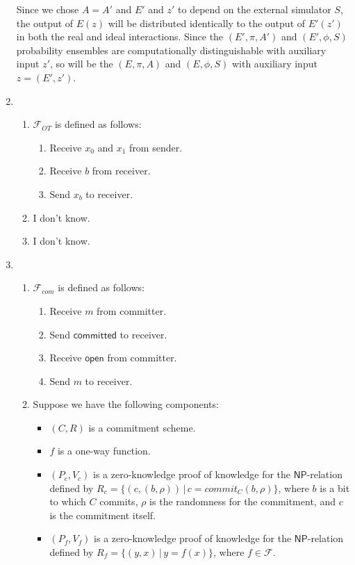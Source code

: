 \documentclass[draft]{article}
\newcommand{\class}[1]{{\ensuremath{\mathsf{#1}}}}
\newcommand{\NP}{\class{NP}}
\begin{document}
\begin{enumerate}
  Since we chose $A=A'$ and $E'$ and $z'$ to depend on the external simulator $S$, the output of $E(z)$ will be distributed identically to the output of $E'(z')$ in both the real and ideal interactions.
  Since the $(E', \pi, A')$ and $(E', \phi, S)$ probability ensembles are computationally distinguishable with auxiliary input $z'$, so will be the $(E, \pi, A)$ and $(E, \phi, S)$ with auxiliary input $z=(E', z')$.
\item
  \begin{enumerate}
  \item $\mathcal{F}_{OT}$ is defined as follows:
    \begin{enumerate}
    \item Receive $x_0$ and $x_1$ from sender.
    \item Receive $b$ from receiver.
    \item Send $x_b$ to receiver.
    \end{enumerate}
  \item I don't know.
  \item I don't know.
  \end{enumerate}
\item
  \begin{enumerate}
  \item $\mathcal{F}_{com}$ is defined as follows:
    \begin{enumerate}
    \item Receive $m$ from committer.
    \item Send $\textsf{committed}$ to receiver.
    \item Receive $\textsf{open}$ from committer.
    \item Send $m$ to receiver.
    \end{enumerate}
  \item
    Suppose we have the following components:
    \begin{itemize}
    \item $(C, R)$ is a commitment scheme.
    \item $f$ is a one-way function.
    \item $(P_c, V_c)$ is a zero-knowledge proof of knowledge for the \NP-relation defined by $R_c=\{(c, (b, \rho)) \,|\, c=commit_C(b, \rho) \}$, where $b$ is a bit to which $C$ commits, $\rho$ is the randomness for the commitment, and $c$ is the commitment itself.
    \item $(P_f, V_f)$ is a zero-knowledge proof of knowledge for the \NP-relation defined by $R_f=\{(y, x)\,|\,y = f(x)\}$, where $f\in\mathcal{F}$.

\end{itemize}
\end{enumerate}
\end{enumerate}
\end{document}
